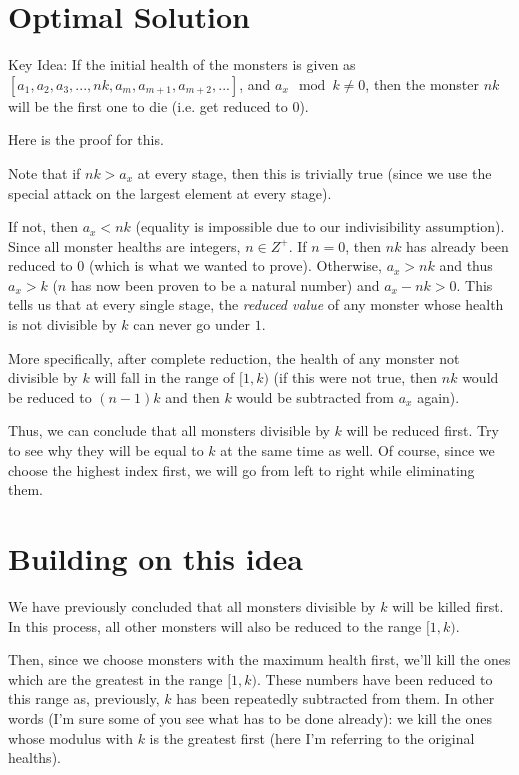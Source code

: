 \documentclass{article}
\begin{document}
\section{Optimal Solution}

Key Idea: If the initial health of the monsters is given as $[a_1, a_2, a_3, ..., nk, a_m, a_{m+1}, a_{m+2}, ...]$, and $a_x\mod k\neq0$, then the monster $nk$ will be the first one to die (i.e. get reduced to 0).

Here is the proof for this.

Note that if $nk > a_x$ at every stage, then this is trivially true (since we use the special attack on the largest element at every stage).

If not, then $a_x < nk$ (equality is impossible due to our indivisibility assumption). Since all monster healths are integers, $n \in Z^+$. If $n = 0$, then $nk$ has already been reduced to 0 (which is what we wanted to prove). Otherwise, $a_x > nk$ and thus $a_x > k$ ($n$ has now been proven to be a natural number) and $a_x - nk > 0$. This tells us that at every single stage, the \textit{reduced value} of any monster whose health is not divisible by $k$ can never go under $1$.

More specifically, after complete reduction, the health of any monster not divisible by $k$ will fall in the range of $[1, k)$ (if this were not true, then $nk$ would be reduced to $(n-1)k$ and then $k$ would be subtracted from $a_x$  again).

Thus, we can conclude that all monsters divisible by $k$ will be reduced first. Try to see why they will be equal to $k$ at the same time as well. Of course, since we choose the highest index first, we will go from left to right while eliminating them.

\section{Building on this idea}

We have previously concluded that all monsters divisible by $k$ will be killed first. In this process, all other monsters will also be reduced to the range $[1,k)$.

Then, since we choose monsters with the maximum health first, we'll kill the ones which are the greatest in the range $[1, k)$. These numbers have been reduced to this range as, previously, $k$ has been repeatedly subtracted from them. In other words (I'm sure some of you see what has to be done already): we kill the ones whose modulus with $k$ is the greatest first (here I'm referring to the original healths).
\end{document}
